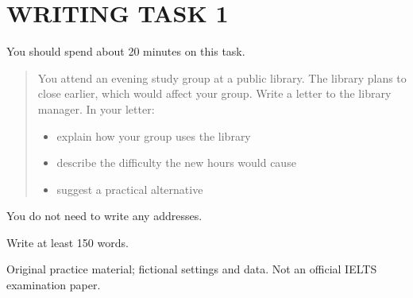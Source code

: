 \section*{WRITING TASK 1}
You should spend about 20 minutes on this task.

\begin{quote}\large You attend an evening study group at a public library. The library plans to close earlier, which would affect your group. Write a letter to the library manager. In your letter:
\begin{itemize}
\item explain how your group uses the library
\item describe the difficulty the new hours would cause
\item suggest a practical alternative
\end{itemize}
\end{quote}
You do not need to write any addresses.

Write at least 150 words.
\par\bigskip
{\footnotesize\color{gray} Original practice material; fictional settings and data. Not an official IELTS examination paper.}
